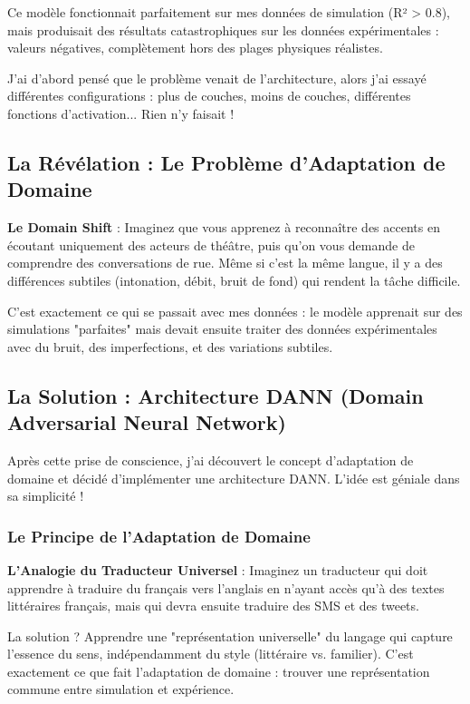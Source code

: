 \documentclass[11pt,a4paper]{article}
\begin{document}
Ce modèle fonctionnait parfaitement sur mes données de simulation (R² > 0.8), mais produisait des résultats catastrophiques sur les données expérimentales : valeurs négatives, complètement hors des plages physiques réalistes.

J'ai d'abord pensé que le problème venait de l'architecture, alors j'ai essayé différentes configurations : plus de couches, moins de couches, différentes fonctions d'activation... Rien n'y faisait !

\subsection{La Révélation : Le Problème d'Adaptation de Domaine}

\begin{warningbox}
\textbf{Le Domain Shift} : Imaginez que vous apprenez à reconnaître des accents en écoutant uniquement des acteurs de théâtre, puis qu'on vous demande de comprendre des conversations de rue. Même si c'est la même langue, il y a des différences subtiles (intonation, débit, bruit de fond) qui rendent la tâche difficile.

C'est exactement ce qui se passait avec mes données : le modèle apprenait sur des simulations "parfaites" mais devait ensuite traiter des données expérimentales avec du bruit, des imperfections, et des variations subtiles.
\end{warningbox}

\subsection{La Solution : Architecture DANN (Domain Adversarial Neural Network)}

Après cette prise de conscience, j'ai découvert le concept d'adaptation de domaine et décidé d'implémenter une architecture DANN. L'idée est géniale dans sa simplicité !

\subsubsection{Le Principe de l'Adaptation de Domaine}

\begin{conceptbox}
\textbf{L'Analogie du Traducteur Universel} : Imaginez un traducteur qui doit apprendre à traduire du français vers l'anglais en n'ayant accès qu'à des textes littéraires français, mais qui devra ensuite traduire des SMS et des tweets.

La solution ? Apprendre une "représentation universelle" du langage qui capture l'essence du sens, indépendamment du style (littéraire vs. familier). C'est exactement ce que fait l'adaptation de domaine : trouver une représentation commune entre simulation et expérience.
\end{conceptbox}
\end{document}
